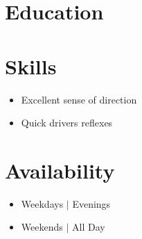 \documentclass{resume_class}
\begin{document}
\section{Education}
\section{Skills}
\begin{itemize}[leftmargin = 10pt , labelsep = 3pt , parsep = 0pt , itemsep = 2pt , label =  {\small $\bullet$} ] 
	\item \mdseries \Large {Excellent sense of direction}
	\item \mdseries \Large  {Quick drivers reflexes}
\end{itemize}

\section{Availability }
\begin{itemize}[leftmargin = 10pt , labelsep = 3pt , parsep = 0pt , itemsep = 2pt , label =  {\small $\bullet$} ] 
	\item \mdseries \Large Weekdays $|$ Evenings
	\item \mdseries \Large Weekends $|$ All Day
\end{itemize}
	
\end{document}
